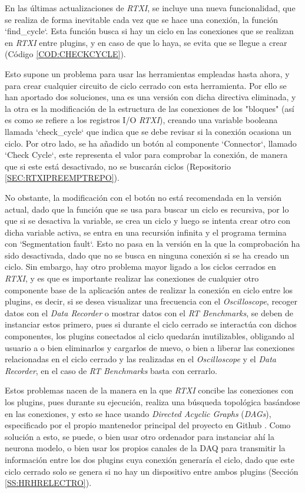 
En las últimas actualizaciones de \textit{RTXI}, se incluye una nueva funcionalidad, que se realiza de forma inevitable cada vez que se hace una conexión, la función `find\_cycle`. Esta función busca si hay un ciclo en las conexiones que se realizan en \textit{RTXI} entre plugins, y en caso de que lo haya, se evita que se llegue a crear (Código \ref{COD:CHECKCYCLE}). 

Esto supone un problema para usar las herramientas empleadas hasta ahora, y para crear cualquier circuito de ciclo cerrado con esta herramienta. Por ello se han aportado dos soluciones, una es una versión con dicha directiva eliminada, y la otra es la modificación de la estructura de las conexiones de los "bloques" (así es como se refiere a los registros I/O \textit{RTXI}), creando una variable booleana llamada `check\_cycle` que indica que se debe revisar si la conexión ocasiona un ciclo. Por otro lado, se ha añadido un botón al componente `Connector`, llamado `Check Cycle`, este representa el valor para comprobar la conexión, de manera que si este está desactivado, no se buscarán ciclos (Repositorio \ref{SEC:RTXIPREEMPTREPO}).

No obstante, la modificación con el botón no está recomendada en la versión actual, dado que la función que se usa para buscar un ciclo es recursiva, por lo que si se desactiva la variable, se crea un ciclo y luego se intenta crear otro con dicha variable activa, se entra en una recursión infinita y el programa termina con `Segmentation fault`. Esto no pasa en la versión en la que la comprobación ha sido desactivada, dado que no se busca en ninguna conexión si se ha creado un ciclo. Sin embargo, hay otro problema mayor ligado a los ciclos cerrados en \textit{RTXI}, y es que es importante realizar las conexiones de cualquier otro componente base de la aplicación antes de realizar la conexión en ciclo entre los plugins, es decir, si se desea visualizar una frecuencia con el \textit{Oscilloscope}, recoger datos con el \textit{Data Recorder} o mostrar datos con el \textit{RT Benchmarks}, se deben de instanciar estos primero, pues si durante el ciclo cerrado se interactúa con dichos componentes, los plugins conectados al ciclo quedarán inutilizables, obligando al usuario a o bien eliminarlos y cargarlos de nuevo, o bien a liberar las conexiones relacionadas en el ciclo cerrado y las realizadas en el \textit{Oscilloscope} y el \textit{Data Recorder}, en el caso de \textit{RT Benchmarks} basta con cerrarlo.

Estos problemas nacen de la manera en la que \textit{RTXI} concibe las conexiones con los plugins, pues durante su ejecución, realiza una búsqueda topológica basándose en las conexiones, y esto se hace usando  \textit{Directed Acyclic Graphs} (\textit{DAGs}), especificado por el propio mantenedor principal del proyecto en Github \cite{IvanFValerio2024}. Como solución a esto, se puede, o bien usar otro ordenador para instanciar ahí la neurona modelo, o bien usar los propios canales de la DAQ para transmitir la información entre los dos plugins cuya conexión generaría el ciclo, dado que este ciclo cerrado solo se genera si no hay un dispositivo entre ambos plugins (Sección \ref{SS:HRHRELECTRO}).


